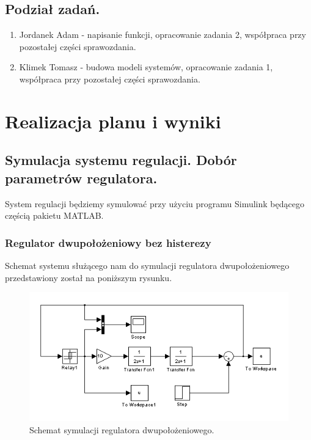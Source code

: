 \documentclass[a4paper,10pt]{article}
\begin{document}
\subsection{Podział zadań. } 
\begin{enumerate}
		\item Jordanek Adam - napisanie funkcji, opracowanie zadania 2, współpraca przy pozostałej części sprawozdania.
		\item Klimek Tomasz - budowa modeli systemów, opracowanie zadania 1, współpraca przy pozostałej części sprawozdania.
\end{enumerate}

\newpage
\section{Realizacja planu i wyniki}
\subsection{Symulacja systemu regulacji. Dobór parametrów regulatora.}\label{sec:zad1}

System regulacji będziemy symulować przy użyciu programu Simulink będącego częścią pakietu M\small ATLAB.\normalsize

\subsubsection{Regulator dwupołożeniowy bez histerezy}\label{sec:r2bh}

Schemat systemu służącego nam do symulacji regulatora dwupołożeniowego przedstawiony został na poniższym rysunku.

\begin{figure}[!h]
    \centering
	\includegraphics[width=120mm]{CW3-schemat-2.PNG}
	\caption{Schemat symulacji regulatora dwupołożeniowego.}
    \label{fig:Rysunek}
\end{figure}
\end{document}
